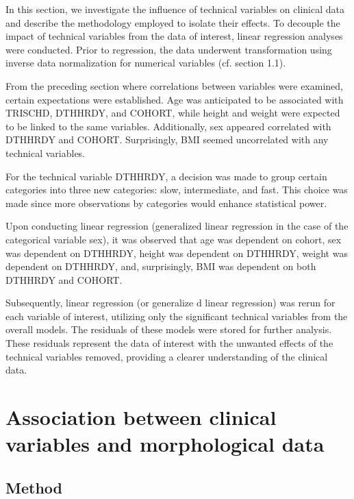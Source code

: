 \documentclass[a4paper, 11pt]{article}
\begin{document}
\begin{multicols}{2}
In this section, we investigate the influence of technical variables on clinical data and describe the methodology employed to isolate their effects.
To decouple the impact of technical variables from the data of interest, linear regression analyses were conducted.
Prior to regression, the data underwent transformation using inverse data normalization for numerical variables (cf. section 1.1).

From the preceding section where correlations between variables were examined, certain expectations were established.
Age was anticipated to be associated with TRISCHD, DTHHRDY, and COHORT, while height and weight were expected to be linked to the same variables.
Additionally, sex appeared correlated with DTHHRDY and COHORT. Surprisingly, BMI seemed uncorrelated with any technical variables.

For the technical variable DTHHRDY, a decision was made to group certain categories into three new categories: slow, intermediate, and fast.
This choice was made since more observations by categories would enhance statistical power.

Upon conducting linear regression (generalized linear regression in the case of the categorical variable sex), it was observed that age was dependent on cohort, sex was dependent on DTHHRDY, height was dependent on DTHHRDY, weight was dependent on DTHHRDY, and, surprisingly, BMI was dependent on both DTHHRDY and COHORT.

Subsequently, linear regression (or generalize d linear regression) was rerun for each variable of interest, utilizing only the significant technical variables from the overall models.
The residuals of these models were stored for further analysis.
These residuals represent the data of interest with the unwanted effects of the technical variables removed, providing a clearer understanding of the clinical data.

\section{Association between clinical variables and morphological data}

\subsection{Method}


\end{multicols}
\end{document}
